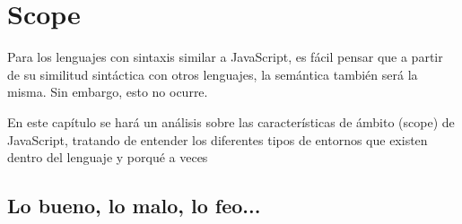 \chapter{Scope}

\label{Chapter7}


Para los lenguajes con sintaxis similar a JavaScript, es fácil pensar que a partir de su similitud sintáctica con otros lenguajes, la semántica también será la misma. Sin embargo, esto no ocurre.

En este capítulo se hará un análisis sobre las características de ámbito (scope) de JavaScript, tratando de entender los diferentes tipos de entornos que existen dentro del lenguaje y porqué a veces


\section{Lo bueno, lo malo, lo feo...}